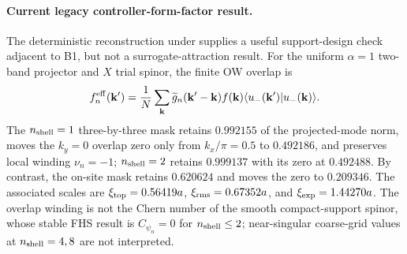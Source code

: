 \documentclass[aps,prx,twocolumn,floatfix,nofootinbib,superscriptaddress,longbibliography]{revtex4-2}
\begin{document}
\paragraph*{Current legacy controller-form-factor result.}
The deterministic reconstruction under  supplies a useful
support-design check adjacent to B1, but not a surrogate-attraction result.  For the uniform
$\alpha=1$ two-band projector and $X$ trial spinor, the finite OW overlap is
\begin{equation}
 f_n^{\rm eff}(\mathbf{k}')=\frac{1}{N}\sum_{\mathbf{k}}
 \widetilde g_n(\mathbf{k}'-\mathbf{k})f(\mathbf{k})
 \langle u_-(\mathbf{k}')|u_-(\mathbf{k})\rangle .
 \label{eq:b1-windowed-form-factor}
\end{equation}
The $n_{\rm shell}=1$ three-by-three mask retains $0.992155$ of the projected-mode norm,
moves the $k_y=0$ overlap zero only from $k_x/\pi=0.5$ to $0.492186$, and preserves local
winding $\nu_n=-1$; $n_{\rm shell}=2$ retains $0.999137$ with its zero at $0.492488$.
By contrast, the on-site mask retains $0.620624$ and moves the zero to $0.209346$.  The
associated scales are $\xi_{\rm top}=0.56419a$, $\xi_{\rm rms}=0.67352a$, and
$\xi_{\rm exp}=1.44270a$.  The overlap winding is not the Chern number of the smooth
compact-support spinor, whose stable FHS result is $C_{\psi_n}=0$ for
$n_{\rm shell}\leq2$; near-singular coarse-grid values at $n_{\rm shell}=4,8$ are not
interpreted.
\end{document}
